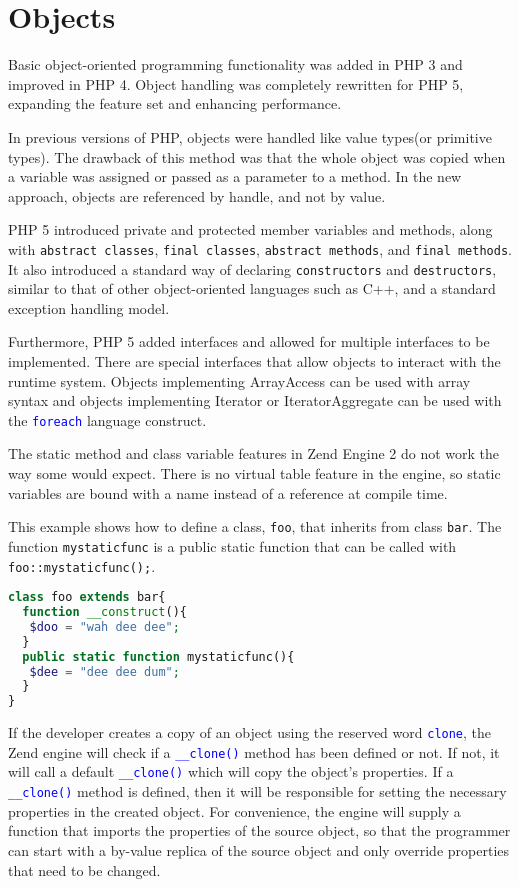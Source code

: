 \chapter{Objects}


Basic object-oriented programming functionality was added in PHP 3 and improved in PHP 4. Object handling was completely rewritten for PHP 5, expanding the feature set and enhancing performance. 

In previous versions of PHP, objects were handled like value types(or primitive types). The drawback of this method was that the whole object was copied when a variable was assigned or passed as a parameter to a method. In the new approach, objects are referenced by handle, and not by value. 

PHP 5 introduced private and protected member variables and methods, along with \texttt{abstract classes}, \texttt{final classes}, \texttt{abstract methods}, and \texttt{final methods}. It also introduced a standard way of declaring \texttt{constructors} and \texttt{destructors}, similar to that of other object-oriented languages such as C++, and a standard exception handling model. 

Furthermore, PHP 5 added interfaces and allowed for multiple interfaces to be implemented. There are special interfaces that allow objects to interact with the runtime system. Objects implementing ArrayAccess can be used with array syntax and objects implementing Iterator or IteratorAggregate can be used with the \textcolor{Blue}{\texttt{foreach}} language construct. 

The static method and class variable features in Zend Engine 2 do not work the way some would expect. There is no virtual table feature in the engine, so static variables are bound with a name instead of a reference at compile time.


This example shows how to define a class, \texttt{foo}, that inherits from class \texttt{bar}. The function \texttt{mystaticfunc} is a public static function that can be called with \texttt{foo::mystaticfunc();}.


\begin{lstlisting}[language=PHP]
class foo extends bar{
  function __construct(){
   $doo = "wah dee dee";
  }
  public static function mystaticfunc(){
   $dee = "dee dee dum";
  }
}
\end{lstlisting}


If the developer creates a copy of an object using the reserved word \textcolor{Blue}{\texttt{clone}}, the Zend engine will check if a \textcolor{Blue}{\texttt{\_\_clone()}} method has been defined or not. If not, it will call a default \textcolor{Blue}{\texttt{\_\_clone()}} which will copy the object's properties. If a \textcolor{Blue}{\texttt{\_\_clone()}} method is defined, then it will be responsible for setting the necessary properties in the created object. For convenience, the engine will supply a function that imports the properties of the source object, so that the programmer can start with a by-value replica of the source object and only override properties that need to be changed.

